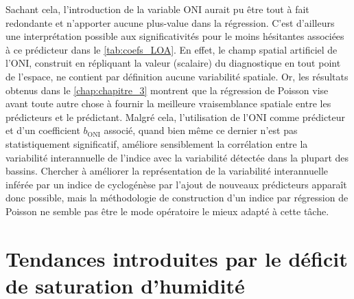 \documentclass[../main.tex]{subfiles}
\begin{document}
Sachant cela, l'introduction de la variable ONI aurait pu être tout à fait redondante et n'apporter aucune plus-value dans la régression. C'est d'ailleurs une
interprétation possible aux significativités pour le moins hésitantes associées à ce prédicteur dans le \cref{tab:coefs_LOA}. En effet, le champ spatial
artificiel de l'ONI, construit en répliquant la valeur (scalaire) du diagnostique en tout point de l'espace, ne contient par définition aucune variabilité
spatiale. Or, les résultats obtenus dans le \cref{chap:chapitre_3} montrent que la régression de Poisson vise avant toute autre chose à fournir la meilleure
vraisemblance spatiale entre les prédicteurs et le prédictant. Malgré cela, l'utilisation de l'ONI comme prédicteur et d'un coefficient $b_{\mathrm{ONI}}$
associé, quand bien même ce dernier n'est pas statistiquement significatif, améliore sensiblement la corrélation entre la variabilité interannuelle de l'indice
avec la variabilité détectée dans la plupart des bassins. Chercher à améliorer la représentation de la variabilité interannuelle inférée par un indice de
cyclogénèse par l'ajout de nouveaux prédicteurs apparaît donc possible, mais la méthodologie de construction d'un indice par régression de Poisson ne semble pas
être le mode opératoire le mieux adapté à cette tâche.


\section{Tendances introduites par le déficit de saturation d'humidité}
\end{document}
